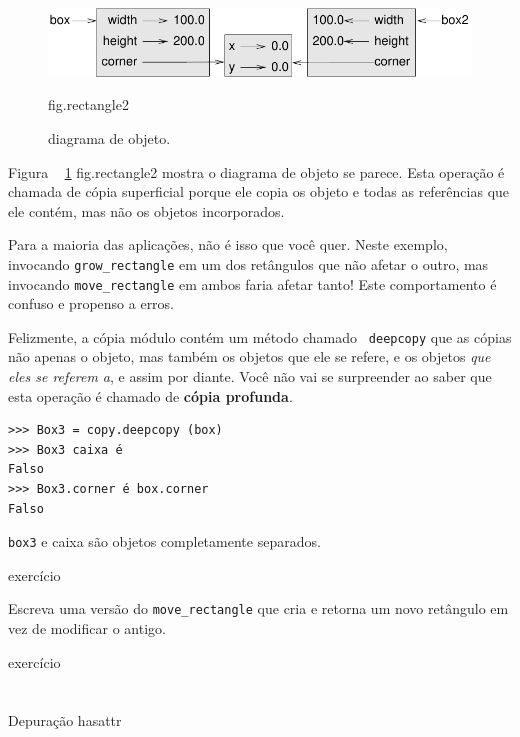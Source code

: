 \documentclass[10pt]{book}
\begin{document}
\begin{v erbatim}
{\begin{figure}
\centerline
{\includegraphics[scale = 0.8] {figs/rectangle2.pdf}}
\caption{diagrama de objeto.}
\label{} fig.rectangle2
\end{figure}

Figura ~ \ref {} fig.rectangle2 mostra o diagrama de objeto se parece.
Esta operação é chamada de {cópia superficial \bf} porque ele copia os
objeto e todas as referências que ele contém, mas não os objetos incorporados.

Para a maioria das aplicações, não é isso que você quer. Neste exemplo,
invocando \verb "grow_rectangle" em um dos retângulos que não
afetar o outro, mas invocando \verb "move_rectangle" em ambos faria
afetar tanto! Este comportamento é confuso e propenso a erros.

Felizmente, a cópia {\tt} módulo contém um método chamado {\tt
deepcopy} que as cópias não apenas o objeto, mas também 
os objetos que ele se refere, e os objetos {\em que eles se referem a},
e assim por diante.
Você não vai se surpreender ao saber que esta operação é
chamado de {\bf cópia profunda}.

\begin{verbatim}
>>> Box3 = copy.deepcopy (box)
>>> Box3 caixa é
Falso
>>> Box3.corner é box.corner
Falso
\end{verbatim}
%
{\tt box3} e {caixa \tt} são objetos completamente separados.


\begin{} exercício

Escreva uma versão do \verb "move_rectangle" que cria e
retorna um novo retângulo em vez de modificar o antigo.

\end{} exercício


\section{} Depuração
\label{} hasattr

}
\end{v erbatim}
\end{document}
